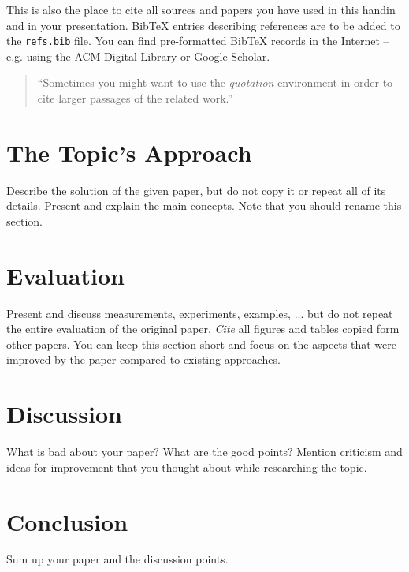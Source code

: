 \documentclass[a4paper,10pt,twoside]{article}
\begin{document}
This is also the place to cite all sources and papers you have used in this handin and in your presentation. 
Bib\TeX$\!$ entries describing references are to be added to the \verb|refs.bib| file. 
You can find pre-formatted Bib\TeX$\!$ records in the Internet -- e.g. using the ACM Digital Library or Google Scholar.

\begin{quotation}
	``Sometimes you might want to use the \emph{quotation} environment in order to cite larger passages of the related work.''
\end{quotation}

\section{The Topic's Approach}

Describe the solution of the given paper, but do not copy it or repeat all of its details.
Present and explain the main concepts. 
Note that you should rename this section. 

\section{Evaluation}

Present and discuss measurements, experiments, examples, ... but do not repeat the entire evaluation of the original paper.
\emph{Cite} all figures and tables copied form other papers.
You can keep this section short and focus on the aspects that were improved by the paper compared to existing approaches.

\section{Discussion}

What is bad about your paper? 
What are the good points? 
Mention criticism and ideas for improvement that you thought about while researching the topic.

\section{Conclusion}

Sum up your paper and the discussion points.


 
\end{document}
